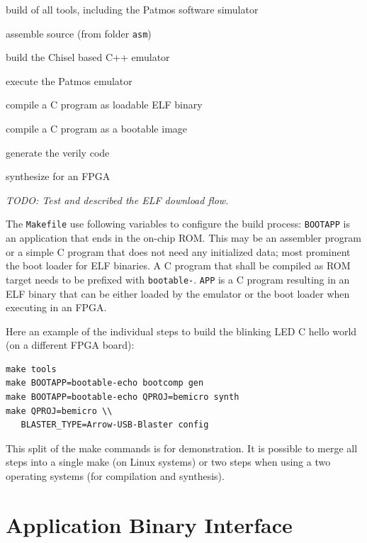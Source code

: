 \documentclass{IEEEtran}
\newcommand{\code}[1]{{\texttt{#1}}}
\newcommand{\todo}[1]{{\emph{TODO: #1}}}
\begin{document}
\begin{description}[\settowidth{\labelwidth}{emulator}]
\item[tools] build of all tools, including the Patmos software simulator
\item[asm] assemble source (from folder \code{asm})
\item[emulator] build the Chisel based C++ emulator
\item[csim] execute the Patmos emulator 
\item[comp] compile a C program as loadable ELF binary
\item[bootcomp] compile a C program as a bootable image
\item[gen] generate the verily code
\item[synth] synthesize for an FPGA
\end{description}


\todo{Test and described the ELF download flow.}

The \code{Makefile} use following variables to configure the build process:
\code{BOOTAPP} is an application that ends in the on-chip ROM. This may
be an assembler program or a simple C program that does not need any
initialized data; most prominent the boot loader for ELF binaries.
A C program that shall be compiled as ROM target needs to be prefixed
with \code{bootable-}.
\code{APP} is a C program resulting in an ELF binary that can be either
loaded by the emulator or the boot loader when executing in an FPGA.

Here an example of the individual steps to build the blinking LED C
hello world (on a different FPGA board):
\begin{verbatim}
make tools
make BOOTAPP=bootable-echo bootcomp gen
make BOOTAPP=bootable-echo QPROJ=bemicro synth
make QPROJ=bemicro \\
   BLASTER_TYPE=Arrow-USB-Blaster config
\end{verbatim}

This split of the make commands is for demonstration. It is
possible to merge all steps into a single make (on Linux
systems) or two steps when using a two operating
systems (for compilation and synthesis).

\section{Application Binary Interface}
\label{sec:abi}
\end{document}

